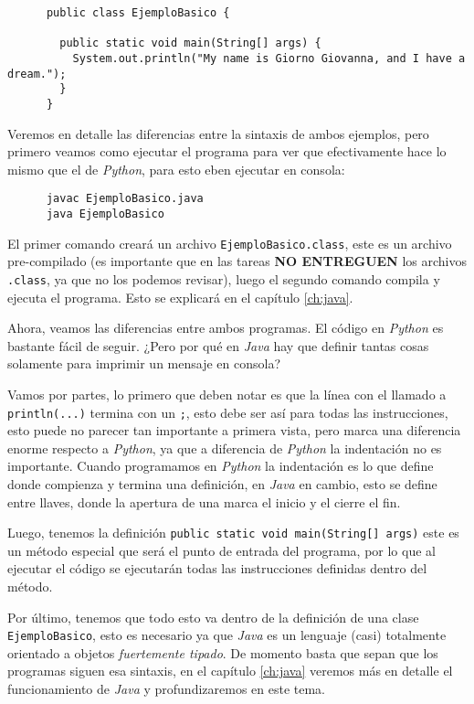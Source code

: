     \begin{verbatim}
      public class EjemploBasico {

        public static void main(String[] args) {
          System.out.println("My name is Giorno Giovanna, and I have a dream.");
        }
      }
    \end{verbatim}

    Veremos en detalle las diferencias entre la sintaxis de ambos ejemplos, pero primero
    veamos como ejecutar el programa para ver que efectivamente hace lo mismo que el de 
    \textit{Python}, para esto eben ejecutar en consola:

    \begin{verbatim}
      javac EjemploBasico.java
      java EjemploBasico
    \end{verbatim}

    El primer comando creará un archivo \texttt{EjemploBasico.class}, este es un archivo
    pre-compilado (es importante que en las tareas \textbf{NO ENTREGUEN} los archivos 
    \texttt{.class}, ya que no los podemos revisar), luego el segundo comando compila y 
    ejecuta el programa.
    Esto se explicará en el capítulo \ref{ch:java}.

    Ahora, veamos las diferencias entre ambos programas.
    El código en \textit{Python} es bastante fácil de seguir.
    ¿Pero por qué en \textit{Java} hay que definir tantas cosas solamente para imprimir un
    mensaje en consola?

    Vamos por partes, lo primero que deben notar es que la línea con el llamado a 
    \texttt{println(...)} termina con un \texttt{;}, esto debe ser así para todas las 
    instrucciones, esto puede no parecer tan importante a primera vista, pero marca una
    diferencia enorme respecto a \textit{Python}, ya que a diferencia de \textit{Python} 
    la indentación no es importante.
    Cuando programamos en \textit{Python} la indentación es lo que define donde compienza
    y termina una definición, en \textit{Java} en cambio, esto se define entre llaves, 
    donde la apertura de una marca el inicio y el cierre el fin.

    Luego, tenemos la definición \texttt{public static void main(String[] args)}
    este es un método especial que será el punto de entrada del programa, por lo que al 
    ejecutar el código se ejecutarán todas las instrucciones definidas dentro del método.
    
    Por último, tenemos que todo esto va dentro de la definición de una clase 
    \texttt{EjemploBasico}, esto es necesario ya que \textit{Java} es un lenguaje 
    (casi) totalmente orientado a objetos \textit{fuertemente tipado}.
    De momento basta que sepan que los programas siguen esa sintaxis, en el capítulo 
    \ref{ch:java} veremos más en detalle el funcionamiento de \textit{Java} y 
    profundizaremos en este tema.

